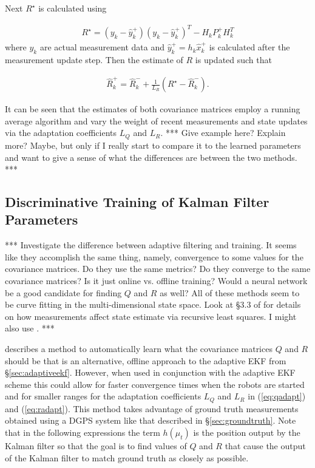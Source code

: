 Next $R^\star$ is calculated using

\begin{align*}
R^\star = \left(y_k-\hat{y}_k^+\right)\left(y_k-\hat{y}_k^+\right)^T - H_kP_k^+H_k^T
\end{align*}
where $y_k$ are actual measurement data and $\hat{y}_k^+ = h_k\hat{x}_k^+$ is calculated after the measurement update step. Then the estimate of $R$ is updated such that

\begin{align}
\label{eq:radapt}
\hat{R}_k^+ = \hat{R}_k^- + \frac{1}{L_R}\left(R^\star-\hat{R}_k^-\right).
\end{align}

It can be seen that the estimates of both covariance matrices employ a running average algorithm and vary the weight of recent measurements and state updates via the adaptation coefficients $L_Q$ and $L_R$. *** Give example here? Explain more? Maybe, but only if I really start to compare it to the learned parameters and want to give a sense of what the differences are between the two methods. ***

\subsection{Discriminative Training of Kalman Filter Parameters}
\label{sec:trainingkfparams}
*** Investigate the difference between adaptive filtering and training. It seems like they accomplish the same thing, namely, convergence to some values for the covariance matrices. Do they use the same metrics? Do they converge to the same covariance matrices? Is it just online vs. offline training? Would a neural network be a good candidate for finding $Q$ and $R$ as well? All of these methods seem to be curve fitting in the multi-dimensional state space. Look at \S3.3 of \cite{Simon06OptimalEstimation} for details on how measurements affect state estimate via recursive least squares. I might also use \cite{Orderud05}. ***

\cite{Abbeel-RSS-05} describes a method to automatically learn what the covariance matrices $Q$ and $R$ should be that is an alternative, offline approach to the adaptive EKF from \S\ref{sec:adaptiveekf}. However, when used in conjunction with the adaptive EKF scheme this could allow for faster convergence times when the robots are started and for smaller ranges for the adaptation coefficients $L_Q$ and $L_R$ in (\ref{eq:qadapt}) and (\ref{eq:radapt}). This method takes advantage of ground truth measurements obtained using a DGPS system like that described in \S\ref{sec:groundtruth}. Note that in the following expressions the term $h(\mu_t)$ is the position output by the Kalman filter so that the goal is to find values of $Q$ and $R$ that cause the output of the Kalman filter to match ground truth as closely as possible.

